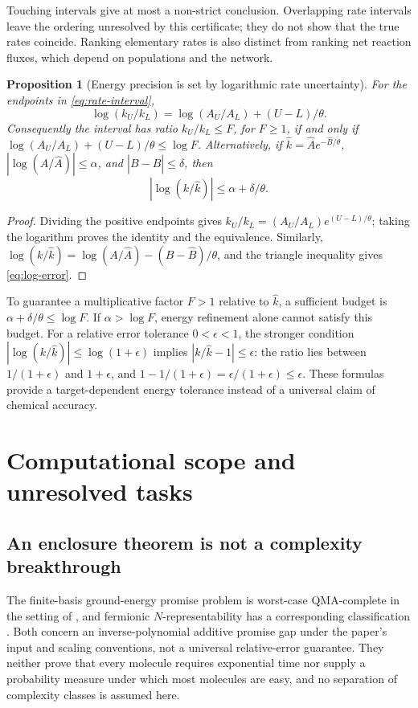 \documentclass[11pt,a4paper]{article}
\theoremstyle{plain}
\newtheorem{proposition}[theorem]{Proposition}
\theoremstyle{definition}
\theoremstyle{remark}
\begin{document}
Touching intervals give at most a non-strict conclusion. Overlapping rate
intervals leave the ordering unresolved by this certificate; they do not
show that the true rates coincide. Ranking elementary rates is also distinct
from ranking net reaction fluxes, which depend on populations and the network.

\begin{proposition}[Energy precision is set by logarithmic rate uncertainty]
\label{prop:log-budget}
For the endpoints in \eqref{eq:rate-interval},
\begin{equation}
 \log(k_U/k_L)=\log(A_U/A_L)+(U-L)/\theta.
 \label{eq:log-width}
\end{equation}
Consequently the interval has ratio $k_U/k_L\le F$, for $F\ge1$, if and
only if
$\log(A_U/A_L)+(U-L)/\theta\le\log F$.
Alternatively, if $\widehat k=\widehat A e^{-\widehat B/\theta}$,
$|\log(A/\widehat A)|\le\alpha$, and
$|B-\widehat B|\le\delta$, then
\begin{equation}
 |\log(k/\widehat k)|\le\alpha+\delta/\theta.
 \label{eq:log-error}
\end{equation}
\end{proposition}
\begin{proof}
Dividing the positive endpoints gives
$k_U/k_L=(A_U/A_L)e^{(U-L)/\theta}$; taking the logarithm proves the
identity and the equivalence. Similarly,
$\log(k/\widehat k)=\log(A/\widehat A)-(B-\widehat B)/\theta$,
and the triangle inequality gives \eqref{eq:log-error}.
\end{proof}

To guarantee a multiplicative factor $F>1$ relative to $\widehat k$, a
sufficient budget is $\alpha+\delta/\theta\le\log F$.
If $\alpha>\log F$, energy refinement alone cannot satisfy this budget.
For a relative error tolerance $0<\epsilon<1$, the stronger condition
$|\log(k/\widehat k)|\le\log(1+\epsilon)$ implies
$|k/\widehat k-1|\le\epsilon$: the ratio lies between
$1/(1+\epsilon)$ and $1+\epsilon$, and
$1-1/(1+\epsilon)=\epsilon/(1+\epsilon)\le\epsilon$.
These formulas provide a target-dependent energy tolerance instead of a
universal claim of chemical accuracy.


\section{Computational scope and unresolved tasks}
\label{sec:complexity}
\subsection{An enclosure theorem is not a complexity breakthrough}
The finite-basis ground-energy promise problem is worst-case QMA-complete in the
setting of \citet{OGorman2022}, and fermionic $N$-representability has a
corresponding classification \citep{Liu2007}. Both concern an inverse-polynomial
additive promise gap under the paper's input and scaling conventions, not a
universal relative-error guarantee. They neither prove that every molecule
requires exponential time nor supply a probability measure under which most
molecules are easy, and no separation of complexity classes is assumed here.
\end{document}
